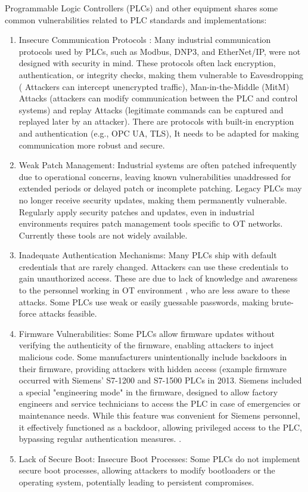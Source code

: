 Programmable Logic Controllers (PLCs) and other equipment  shares some common vulnerabilities related to PLC standards and implementations:
\begin{enumerate}
    \item Insecure Communication Protocols : Many industrial communication protocols used by PLCs, such as Modbus, DNP3, and EtherNet/IP, were not designed with security in mind. These protocols often lack encryption, authentication, or integrity checks, making them vulnerable to Eavesdropping ( Attackers can intercept unencrypted traffic), Man-in-the-Middle (MitM) Attacks (attackers can modify communication between the PLC and control systems) and replay Attacks (legitimate commands can be captured and replayed later by an attacker). There are protocols with built-in encryption and authentication (e.g., OPC UA, TLS), It needs to be adapted for making communication more robust and secure\cite{s7threats}.

    \item Weak Patch Management: Industrial systems are often patched infrequently due to operational concerns, leaving known vulnerabilities unaddressed for extended periods or delayed patch or incomplete patching. Legacy PLCs may no longer receive security updates, making them permanently vulnerable. Regularly apply security patches and updates, even in industrial environments requires patch management tools specific to OT networks. Currently these tools are not widely available. 

    \item Inadequate Authentication Mechanisms: Many PLCs ship with default credentials that are rarely changed. Attackers can use these credentials to gain unauthorized access. These are due to lack of knowledge and awareness to the personnel working in OT environment , who are less aware to these attacks. Some PLCs use weak or easily guessable passwords, making brute-force attacks feasible.

    \item Firmware Vulnerabilities: Some PLCs allow firmware updates without verifying the authenticity of the firmware, enabling attackers to inject malicious code. Some manufacturers unintentionally include backdoors in their firmware, providing attackers with hidden access (example firmware occurred with Siemens' S7-1200 and S7-1500 PLCs in 2013. Siemens included a special "engineering mode" in the firmware, designed to allow factory engineers and service technicians to access the PLC in case of emergencies or maintenance needs. While this feature was convenient for Siemens personnel, it effectively functioned as a backdoor, allowing privileged access to the PLC, bypassing regular authentication measures. \cite{enlyze}. 
    \item Lack of Secure Boot: Insecure Boot Processes: Some PLCs do not implement secure boot processes, allowing attackers to modify bootloaders or the operating system, potentially leading to persistent compromises.


\end{enumerate}
